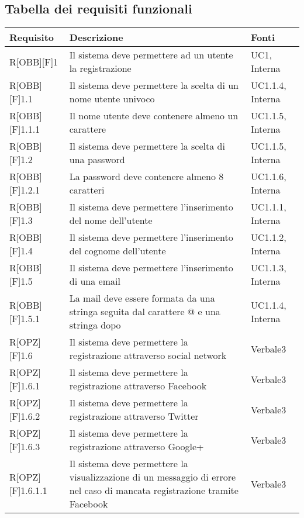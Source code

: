 \subsection{Tabella dei requisiti funzionali}
	\begin{table}[h]
		\begin{tabular}{|p{}|p{}|p{}|}
			\toprule
			
			\textbf{Requisito} & \textbf{Descrizione} & \textbf{Fonti} \\
			
			\midrule

R[OBB][F]1 & Il sistema deve permettere ad un utente la registrazione & UC1, Interna \\ \midrule
R[OBB][F]1.1 & Il sistema deve permettere la scelta di un nome utente univoco & UC1.1.4, Interna \\ \midrule
R[OBB][F]1.1.1 & Il nome utente deve contenere almeno un carattere & UC1.1.5, Interna \\ \midrule
R[OBB][F]1.2 & Il sistema deve permettere la scelta di una password & UC1.1.5, Interna \\ \midrule
R[OBB][F]1.2.1 & La password deve contenere almeno 8 caratteri & UC1.1.6, Interna \\ \midrule
R[OBB][F]1.3 & Il sistema deve permettere l'inserimento del nome dell'utente & UC1.1.1, Interna \\ \midrule
R[OBB][F]1.4 & Il sistema deve permettere l'inserimento del cognome dell'utente & UC1.1.2, Interna \\ \midrule
R[OBB][F]1.5 & Il sistema deve permettere l'inserimento di una email & UC1.1.3, Interna \\ \midrule
R[OBB][F]1.5.1 & La mail deve essere formata da una stringa seguita dal carattere @ e una stringa dopo & UC1.1.4, Interna \\ \midrule
R[OPZ][F]1.6 & Il sistema deve permettere la registrazione attraverso social network & Verbale3 \\ \midrule
R[OPZ][F]1.6.1 & Il sistema deve permettere la registrazione attraverso \gls{Facebook} & Verbale3 \\ \midrule
R[OPZ][F]1.6.2 & Il sistema deve permettere la registrazione attraverso Twitter & Verbale3 \\ \midrule
R[OPZ][F]1.6.3 & Il sistema deve permettere la registrazione attraverso Google+ & Verbale3 \\ \midrule
R[OPZ][F]1.6.1.1 & Il sistema deve permettere la visualizzazione di un messaggio di errore nel caso di mancata registrazione tramite \gls{Facebook} & Verbale3 \\ \midrule

\end{tabular}
\end{table}

